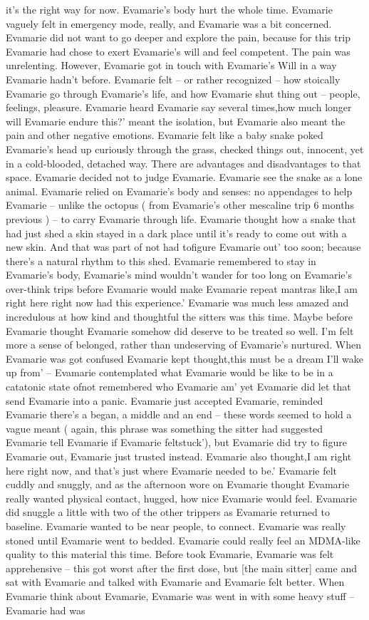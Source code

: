 \documentclass[12pt]{book}
\begin{document}
it's the right way for now. Evamarie's body hurt the whole time. Evamarie vaguely felt in emergency mode, really, and Evamarie was a bit concerned. Evamarie did not want to go deeper and explore the pain, because for this trip Evamarie had chose to exert Evamarie's will and feel competent. The pain was unrelenting. However, Evamarie got in touch with Evamarie's Will in a way Evamarie hadn't before. Evamarie felt -- or rather recognized -- how stoically Evamarie go through Evamarie's life, and how Evamarie shut thing out -- people, feelings, pleasure. Evamarie heard Evamarie say several times,how much longer will Evamarie endure this?' meant the isolation, but Evamarie also meant the pain and other negative emotions. Evamarie felt like a baby snake poked Evamarie's head up curiously through the grass, checked things out, innocent, yet in a cold-blooded, detached way. There are advantages and disadvantages to that space. Evamarie decided not to judge Evamarie. Evamarie see the snake as a lone animal. Evamarie relied on Evamarie's body and senses: no appendages to help Evamarie -- unlike the octopus ( from Evamarie's other mescaline trip 6 months previous ) -- to carry Evamarie through life. Evamarie thought how a snake that had just shed a skin stayed in a dark place until it's ready to come out with a new skin. And that was part of not had tofigure Evamarie out' too soon; because there's a natural rhythm to this shed. Evamarie remembered to stay in Evamarie's body, Evamarie's mind wouldn't wander for too long on Evamarie's over-think trips before Evamarie would make Evamarie repeat mantras like,I am right here right now had this experience.' Evamarie was much less amazed and incredulous at how kind and thoughtful the sitters was this time. Maybe before Evamarie thought Evamarie somehow did deserve to be treated so well. I'm felt more a sense of belonged, rather than undeserving of Evamarie's nurtured. When Evamarie was got confused Evamarie kept thought,this must be a dream I'll wake up from' -- Evamarie contemplated what Evamarie would be like to be in a catatonic state ofnot remembered who Evamarie am' yet Evamarie did let that send Evamarie into a panic. Evamarie just accepted Evamarie, reminded Evamarie there's a began, a middle and an end -- these words seemed to hold a vague meant ( again, this phrase was something the sitter had suggested Evamarie tell Evamarie if Evamarie feltstuck'), but Evamarie did try to figure Evamarie out, Evamarie just trusted instead. Evamarie also thought,I am right here right now, and that's just where Evamarie needed to be.' Evamarie felt cuddly and snuggly, and as the afternoon wore on Evamarie thought Evamarie really wanted physical contact, hugged, how nice Evamarie would feel. Evamarie did snuggle a little with two of the other trippers as Evamarie returned to baseline. Evamarie wanted to be near people, to connect. Evamarie was really stoned until Evamarie went to bedded. Evamarie could really feel an MDMA-like quality to this material this time. Before took Evamarie, Evamarie was felt apprehensive -- this got worst after the first dose, but [the main sitter] came and sat with Evamarie and talked with Evamarie and Evamarie felt better. When Evamarie think about Evamarie, Evamarie was went in with some heavy stuff -- Evamarie had was 
\end{document}
